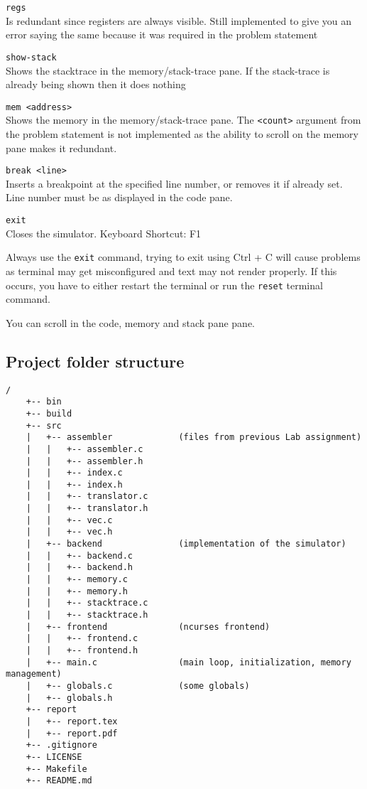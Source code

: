 \documentclass[12pt]{article}
\begin{document}
	\verb|regs|\\
	Is redundant since registers are always visible. Still implemented to give you an error saying the same because it was required in the problem statement

	\verb|show-stack|\\
	Shows the stacktrace in the memory/stack-trace pane. If the stack-trace is already being shown then it does nothing

	\verb|mem <address>|\\
	Shows the memory in the memory/stack-trace pane. The \verb|<count>| argument from the problem statement is not implemented as the ability to scroll on the memory pane makes it redundant.

	\verb|break <line>|\\
	Inserts a breakpoint at the specified line number, or removes it if already set. Line number must be as displayed in the code pane.

	\verb|exit|\\
	Closes the simulator. Keyboard Shortcut: F1
	
	Always use the \verb|exit| command, trying to exit using Ctrl + C will cause problems as terminal may get misconfigured and text may not render properly. If this occurs, you have to either restart the terminal or run the \verb|reset| terminal command.

	You can scroll in the code, memory and stack pane pane.

	\subsection{Project folder structure}
	
	\begin{verbatim}/
	+-- bin
	+-- build
	+-- src
	|   +-- assembler             (files from previous Lab assignment)
	|   |   +-- assembler.c
	|   |   +-- assembler.h
	|   |   +-- index.c
	|   |   +-- index.h
	|   |   +-- translator.c
	|   |   +-- translator.h
	|   |   +-- vec.c
	|   |   +-- vec.h
	|   +-- backend               (implementation of the simulator)
	|   |   +-- backend.c
	|   |   +-- backend.h
	|   |   +-- memory.c
	|   |   +-- memory.h
	|   |   +-- stacktrace.c
	|   |   +-- stacktrace.h
	|   +-- frontend              (ncurses frontend)
	|   |   +-- frontend.c
	|   |   +-- frontend.h
	|   +-- main.c                (main loop, initialization, memory management)
	|   +-- globals.c             (some globals)
	|   +-- globals.h
	+-- report
	|   +-- report.tex
	|   +-- report.pdf
	+-- .gitignore
	+-- LICENSE
	+-- Makefile
	+-- README.md\end{verbatim}
\end{document}
